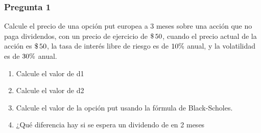 \documentclass{beamer}
\begin{document}
\pgfmathsetmacro{\acuatro}{(\rdiez+ \ados)*\Tuno}
\pgfmathsetmacro{\acinco}{\auno+\acuatro }
\pgfmathsetmacro{\aseis}{\acinco /\atres }
\pgfmathsetmacro{\asiete}{\aseis - \atres}

\newcommand{\deuno}{\decimalx{\aseis}}
\newcommand{\dedos}{\decimalx{\asiete}}

\pgfmathsetmacro{\anueve}{\Kuno*\aocho*\phimenosddos}
\pgfmathsetmacro{\adiez}{\Suno*\phimenosduno}
\pgfmathsetmacro{\aonce}{\anueve - \adiez}

\pgfmathsetmacro{\acatorce}{\Suno-\atrece}
\newcommand{\Sdos}{\decimalx{\acatorce}}
\pgfmathsetmacro{\adieciseis}{\aquince+\acinco}
\pgfmathsetmacro{\adiecisiete}{\adieciseis/\atres}
\pgfmathsetmacro{\adieciocho}{\adiecisiete-\atres}
\pgfmathsetmacro{\adiecinueve}{-\adieciocho}


\pgfmathsetmacro{\aveinte}{\Kuno*\aocho*\aveinticuatro}
\pgfmathsetmacro{\aveintiuno}{\acatorce*\aveintitres}
\pgfmathsetmacro{\aveintidos}{\aveinte-\aveintiuno}




\newcommand{\Preguno}{Calcule el precio de una opción put europea a 3 meses sobre una acción que no paga dividendos, 
con un precio de ejercicio de $\dinero{\Kuno}$, cuando el precio actual de la acción es $\dinero{\Suno}$, la tasa 
de interés libre de riesgo es de $\porcentaje{\rdiez}$ anual, y la volatilidad es de $\porcentaje{\sigmaPuno}$ anual.
}
\newcommand{\Pregunoa}{Calcule el valor de d1}
\newcommand{\Pregunob}{Calcule el valor de d2}
\newcommand{\Pregunoc}{Calcule el valor de la opción put usando la fórmula de Black-Scholes.}
\newcommand{\Pregunod}{¿Qué diferencia hay si se espera un dividendo de \dinero{\Divuno} en 2 meses}



\begin{frame}
  \frametitle{Pregunta 1}
  \justify
  \Preguno
  \vspace{1em}

\begin{enumerate}[label=\textbf{\alph*)}]
  \item \Pregunoa
  \item \Pregunob
  \item \Pregunoc
  \item \Pregunod
\end{enumerate}

\end{frame}
\end{document}
